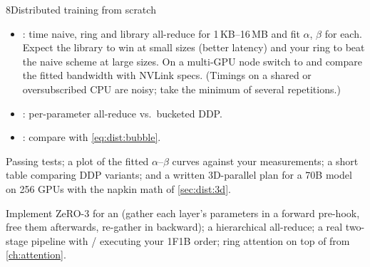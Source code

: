 \begin{labbox}{8}{Distributed training from scratch}
\begin{itemize}
\item {}: time naive, ring and library all-reduce for
  1\,KB--16\,MB and fit $\alpha$, $\beta$ for each. Expect the library to win at small sizes
  (better latency) and your ring to beat the naive scheme at large sizes. On a multi-GPU node
  switch to  and compare the fitted bandwidth with NVLink specs. (Timings on
  a shared or oversubscribed CPU are noisy; take the minimum of several repetitions.)
\item {}: per-parameter all-reduce vs.\ bucketed DDP.
\item {}: compare with \cref{eq:dist:bubble}.
\end{itemize}

Passing tests; a plot of the fitted $\alpha$--$\beta$ curves against your measurements; a short
table comparing DDP variants; and a written 3D-parallel plan for a 70B model on 256 GPUs with
the napkin math of \cref{sec:dist:3d}.

Implement ZeRO-3 for an  (gather each layer's parameters in a forward
pre-hook, free them afterwards, re-gather in backward); a hierarchical all-reduce; a real
two-stage pipeline with / executing your 1F1B order; ring
attention on top of  from \cref{ch:attention}.
\end{labbox}
